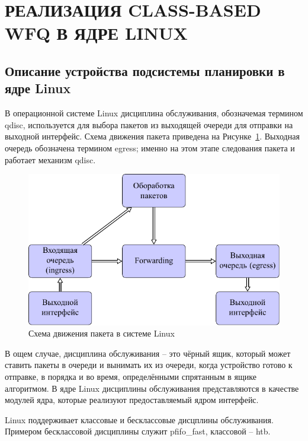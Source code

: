 \section{РЕАЛИЗАЦИЯ CLASS-BASED WFQ В ЯДРЕ LINUX}

	\subsection{Описание устройства подсистемы планировки в ядре Linux}

	В операционной системе Linux
	дисциплина обслуживания, обозначемая термином qdisc, используется
	для выбора пакетов из выходящей очереди для отправки на выходной интерфейс.
	Схема движения пакета приведена на Рисунке~\ref{pic:flow}. Выходная очередь
	обозначена термином egress; именно на этом этапе следования пакета
	и работает механизм qdisc.\cite{lartc}

    \begin{figure}[ht!]
        \center
        \includegraphics{pdfimages/qdisc.pdf}
        \caption{Схема движения пакета в системе Linux\cite{tcpip}}
		\label{pic:flow}
    \end{figure}

	В ощем случае, дисциплина обслуживания -- это чёрный ящик, который может
	ставить пакеты в очереди и вынимать их из очереди, когда устройство
	готово к отправке, в порядка и во время, определёнными спрятанным в ящике
	алгоритмом. В ядре Linux дисциплины обслуживания представляются в качестве
	модулей ядра, которые реализуют предоставляемый ядром интерфейс.

	Linux поддерживает классовые и бесклассовые дисцплины обслуживания. Примером
	бесклассовой дисциплины служит pfifo\_fast, классовой -- htb.\cite{lartc}

